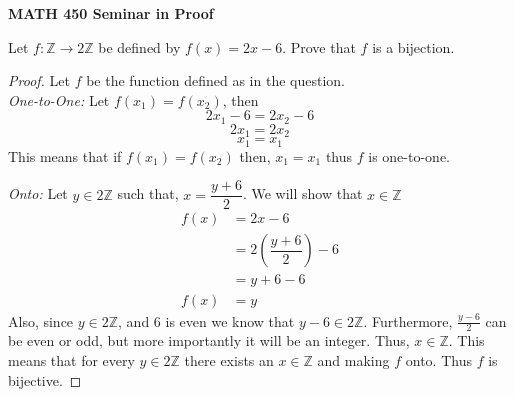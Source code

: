 \documentclass[14pt, fullpage]{article}
\newcommand{\Z}{\mathbb Z}
\begin{document}
\begin{center}
		
{\bf MATH 450 Seminar in Proof}
 \\
\end{center}
	Let $f: \Z \rightarrow 2\Z$ be defined by $f(x) = 2x - 6.$ Prove that $f$ is a bijection.
\begin{proof}
	Let $f$ be the function defined as in the question.\\
	\textit{One-to-One:} Let $f(x_1) = f(x_2)$, then \\
	\begin{equation}
	2x_1 - 6 = 2x_2 - 6
	\end{equation}
	\begin{equation}	
	2x_1 = 2x_2
	\end{equation}
	\begin{equation}
	x_1 = x_1 
	\end{equation}
	This  means that if $f(x_1) = f(x_2)$ then, $x_1 = x_1$ thus $f$ is one-to-one.

	\textit{Onto:} Let $y \in 2\Z$ such that, $x = \dfrac{y+6}{2}$. We will show that $x \in \Z$ \\
	\begin{equation}			
		\begin{split}
			f(x) &= 2x - 6 \\ 
				 &= 2\left(\dfrac{y+6}{2}\right) - 6\\
				 &= y+6-6\\
			f(x) &= y			
		\end{split}
	\end{equation}
	Also, since $y \in 2\Z$, and 6 is even we know that $y-6 \in 2\Z$. Furthermore, $\frac{y-6}{2}$ can be even or odd, but more importantly it will be an integer. Thus, $x \in \Z$.
	This  means that for every $y \in 2\Z$ there exists an $x \in \Z$ and making $f$ onto. Thus $f$ is bijective.
\end{proof}
\end{document}
